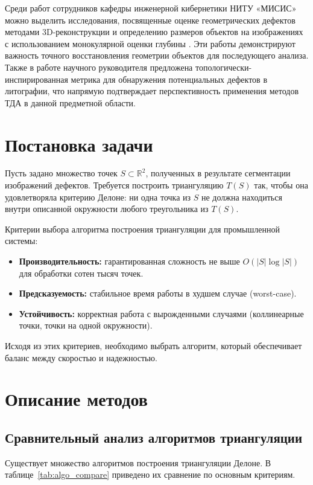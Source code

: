 \documentclass{misisarticle}
\begin{document}
Среди работ сотрудников кафедры инженерной кибернетики НИТУ «МИСИС» можно выделить исследования, посвященные оценке геометрических 
дефектов методами 3D-реконструкции \cite{demin2026} и определению размеров объектов на изображениях с использованием монокулярной 
оценки глубины \cite{prokhorov2026}. Эти работы демонстрируют важность точного восстановления геометрии объектов для последующего 
анализа. Также в работе научного руководителя \cite{korovin2026} предложена топологически-инспирированная метрика для обнаружения 
потенциальных дефектов в литографии, что напрямую подтверждает перспективность применения методов ТДА в данной предметной области.

\section{Постановка задачи}
Пусть задано множество точек \(S \subset \mathbb{R}^2\), полученных в результате сегментации изображений дефектов. Требуется построить 
триангуляцию \(T(S)\) так, чтобы она удовлетворяла критерию Делоне: ни одна точка из \(S\) не должна находиться внутри описанной 
окружности любого треугольника из \(T(S)\).

Критерии выбора алгоритма построения триангуляции для промышленной системы:
\begin{itemize}
  \item \textbf{Производительность:} гарантированная сложность не выше \(O(|S| \log |S|)\) для обработки сотен тысяч точек.
  \item \textbf{Предсказуемость:} стабильное время работы в худшем случае (worst-case).
  \item \textbf{Устойчивость:} корректная работа с вырожденными случаями (коллинеарные точки, точки на одной окружности).
\end{itemize}

Исходя из этих критериев, необходимо выбрать алгоритм, который обеспечивает баланс между скоростью и надежностью.

\section{Описание методов}

\subsection{Сравнительный анализ алгоритмов триангуляции}

Существует множество алгоритмов построения триангуляции Делоне. В таблице~\ref{tab:algo_compare} приведено их сравнение по основным критериям.
\end{document}

